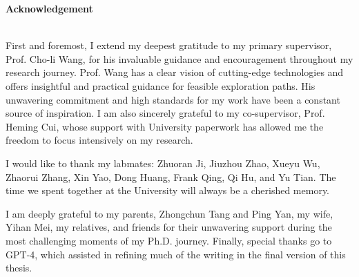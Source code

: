 \centering
{\bf \large Acknowledgement}\\
~\\
\justifying

First and foremost, I extend my deepest gratitude to my primary supervisor, Prof. Cho-li Wang, for his invaluable guidance and encouragement throughout my research journey. Prof. Wang has a clear vision of cutting-edge technologies and offers insightful and practical guidance for feasible exploration paths. His unwavering commitment and high standards for my work have been a constant source of inspiration. I am also sincerely grateful to my co-supervisor, Prof. Heming Cui, whose support with University paperwork has allowed me the freedom to focus intensively on my research.

I would like to thank my labmates: Zhuoran Ji, Jiuzhou Zhao, Xueyu Wu, Zhaorui Zhang, Xin Yao, Dong Huang, Frank Qing, Qi Hu, and Yu Tian. The time we spent together at the University will always be a cherished memory.

I am deeply grateful to my parents, Zhongchun Tang and Ping Yan, my wife, Yihan Mei, my relatives, and friends for their unwavering support during the most challenging moments of my Ph.D. journey. Finally, special thanks go to GPT-4, which assisted in refining much of the writing in the final version of this thesis.